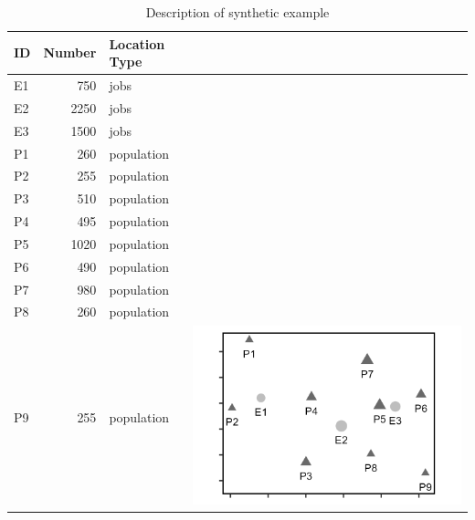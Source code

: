 \documentclass[]{elsarticle} %
\begin{document}
\begin{table}

\caption{\label{tab:toy-example-table}\label{tab:toy-example}Description of synthetic example}
\centering
\begin{tabular}[t]{lrl>{}l}
\toprule
ID & Number & Location Type &  \\
\midrule
E1 & 750 & jobs & \\

E2 & 2250 & jobs & \\

E3 & 1500 & jobs & \\

P1 & 260 & population & \\

P2 & 255 & population & \\

P3 & 510 & population & \\

P4 & 495 & population & \\

P5 & 1020 & population & \\

P6 & 490 & population & \\

P7 & 980 & population & \\

P8 & 260 & population & \\

P9 & 255 & population & \multirow{-12}{*}{\raggedright\arraybackslash \includegraphics{images/figure-1.png}}\\
\bottomrule
\end{tabular}
\end{table}
\end{document}
